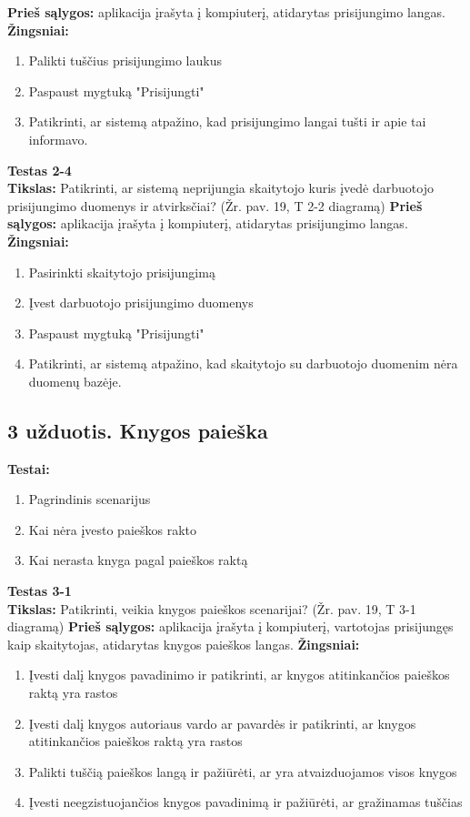 \documentclass{VUMIFPSkursinis}
\begin{document}
\hfill \break
\hfill \break
\textbf{Prieš sąlygos:} aplikacija įrašyta į kompiuterį, atidarytas prisijungimo langas.
\hfill \break
\hfill \break
\textbf{Žingsniai:}
\hfill \break
\begin{enumerate}
\item Palikti tuščius prisijungimo laukus
\item Paspaust mygtuką "Prisijungti"
\item Patikrinti, ar sistemą atpažino, kad prisijungimo langai tušti ir apie tai informavo.
\end{enumerate}
\hfill \break
\textbf{Testas 2-4}\\
\hfill \break
\textbf{Tikslas:} Patikrinti, ar sistemą neprijungia skaitytojo kuris įvedė darbuotojo prisijungimo duomenys ir atvirksčiai? (Žr. pav. 19, T 2-2 diagramą)
\hfill \break
\hfill \break
\textbf{Prieš sąlygos:} aplikacija įrašyta į kompiuterį, atidarytas prisijungimo langas.
\hfill \break
\hfill \break
\textbf{Žingsniai:}
\hfill \break
\begin{enumerate}
\item Pasirinkti skaitytojo prisijungimą
\item Įvest darbuotojo prisijungimo duomenys
\item Paspaust mygtuką "Prisijungti"
\item Patikrinti, ar sistemą atpažino, kad skaitytojo su darbuotojo duomenim nėra duomenų bazėje.
\end{enumerate}

\subsection*{3 užduotis. Knygos paieška}
\textbf{Testai:}

\begin{enumerate}
\item Pagrindinis scenarijus
\item Kai nėra įvesto paieškos rakto
\item Kai nerasta knyga pagal paieškos raktą
\end{enumerate}
\hfill \break
\textbf{Testas 3-1}\\
\hfill \break
\textbf{Tikslas:} Patikrinti, veikia knygos paieškos scenarijai? (Žr. pav. 19, T 3-1 diagramą)
\hfill \break
\hfill \break
\textbf{Prieš sąlygos:} aplikacija įrašyta į kompiuterį, vartotojas prisijungęs kaip skaitytojas, atidarytas knygos paieškos langas.
\hfill \break
\hfill \break
\textbf{Žingsniai:}
\hfill \break
\begin{enumerate}
\item Įvesti dalį knygos pavadinimo ir patikrinti, ar knygos atitinkančios paieškos raktą yra rastos
\item Įvesti dalį knygos autoriaus vardo ar pavardės ir patikrinti, ar knygos atitinkančios paieškos raktą yra rastos
\item Palikti tuščią paieškos langą ir pažiūrėti, ar yra atvaizduojamos visos knygos
\item Įvesti neegzistuojančios knygos pavadinimą ir pažiūrėti, ar gražinamas tuščias
\end{enumerate}
\end{document}

